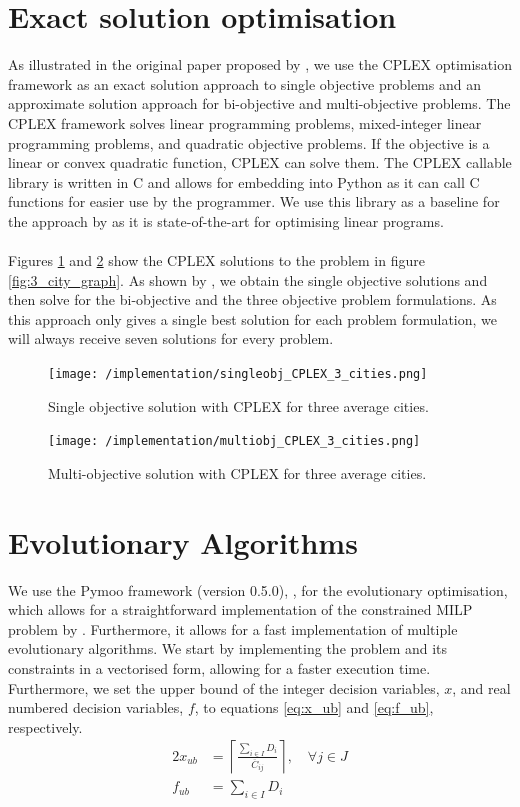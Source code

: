 \documentclass[mscthesis, 11pt]{usiinfthesis}
\theoremstyle{newdefinition}
\begin{document}
\section{Exact solution optimisation}
As illustrated in the original paper proposed by \cite{olapiriyakul_multiobjective_2019}, we use the CPLEX optimisation framework as an exact solution approach to single objective problems and an approximate solution approach for bi-objective and multi-objective problems. The CPLEX framework solves linear programming problems, mixed-integer linear programming problems, and quadratic objective problems. If the objective is a linear or convex quadratic function, CPLEX can solve them. The CPLEX callable library is written in C and allows for embedding into Python as it can call C functions for easier use by the programmer. We use this library as a baseline for the approach by \cite{olapiriyakul_multiobjective_2019} as it is state-of-the-art for optimising linear programs. 
\\\\
Figures \ref{fig:single_cplex_three_cities} and \ref{fig:multi_cplex_three_cities} show the CPLEX solutions to the problem in figure \ref{fig:3_city_graph}. As shown by \cite{olapiriyakul_multiobjective_2019}, we obtain the single objective solutions and then solve for the bi-objective and the three objective problem formulations. As this approach only gives a single best solution for each problem formulation, we will always receive seven solutions for every problem.
\begin{figure}[ht]
    \centering
    \texttt{[image: /implementation/singleobj\_CPLEX\_3\_cities.png]}
    \caption{Single objective solution with CPLEX for three average cities.}
    \label{fig:single_cplex_three_cities}
\end{figure}
\begin{figure}[ht]
    \centering
    \texttt{[image: /implementation/multiobj\_CPLEX\_3\_cities.png]}
    \caption{Multi-objective solution with CPLEX for three average cities.}
    \label{fig:multi_cplex_three_cities}
\end{figure}
\clearpage
\section{Evolutionary Algorithms}
We use the Pymoo framework (version 0.5.0), \cite{blank_pymoo_2020}, for the evolutionary optimisation, which allows for a straightforward implementation of the constrained MILP problem by \cite{olapiriyakul_multiobjective_2019}. Furthermore, it allows for a fast implementation of multiple evolutionary algorithms. We start by implementing the problem and its constraints in a vectorised form, allowing for a faster execution time. Furthermore, we set the upper bound of the integer decision variables, $x$, and real numbered decision variables, $f$, to equations \ref{eq:x_ub} and \ref{eq:f_ub}, respectively. 
\begin{alignat}{2}
    x_{ub} &= \left\lceil \frac{\sum_{i \in I} D_i}{\overline{C}_{ij}}  \right\rceil, \quad \forall j \in J \label{eq:x_ub}\\
    f_{ub} &= \sum_{i \in I} D_i\label{eq:f_ub}
\end{alignat}
    
\end{document}
